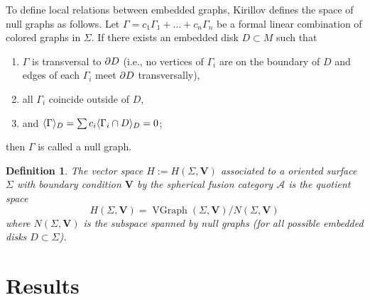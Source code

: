 \documentclass{amsart}
\newtheorem{prop}[thm]{Proposition}
\newtheorem{defn}[thm]{Definition}
\newcommand{\Hs}{H}
\DeclareMathOperator{\MCG}{MCG}
\DeclareMathOperator{\Homeo}{Homeo}
\DeclareMathOperator{\VGr}{VGraph}
\newcommand{\VV}{\mathbf{V}}       %
\newcommand{\Ga}{\Gamma}
\newcommand{\Si}{\Sigma}
\begin{document}
To define local relations between embedded graphs, Kirillov defines the space of null graphs as follows. Let
$\Ga=c_1\Ga_1+\dots+c_n\Ga_n$ be a formal linear
combination of colored graphs in $\Si$.  If there exists an embedded disk $D \subset M$ such that
\begin{enumerate}
  \item $\Ga$ is transversal to $\partial D$ (i.e., no vertices of $\Ga_i$ 
      are on the boundary of $D$ and edges of each $\Ga_i$ meet 
      $\partial D$ transversally),
  \item all $\Ga_i$ coincide outside of $D$,
  \item and $\<\Ga\>_D=\sum c_i\<\Ga_i\cap D\>_D=0$;
\end{enumerate}
then $\Ga$ is called a null graph. 




\begin{defn}
The vector space $H := \Hs(\Si, \VV)$ associated to a oriented surface $\Si$ with boundary condition $\VV$ by the spherical fusion category $\mathcal A$ is the quotient space
 $$
   \Hs(\Si, \VV)=\VGr(\Si, \VV)/N(\Si, \VV)
  $$
  where $N(\Si, \VV)$ is  the subspace spanned by null graphs 
  (for all possible embedded disks  $D \subset \Si$). 
\end{defn}

\section{Results}



\end{document}
